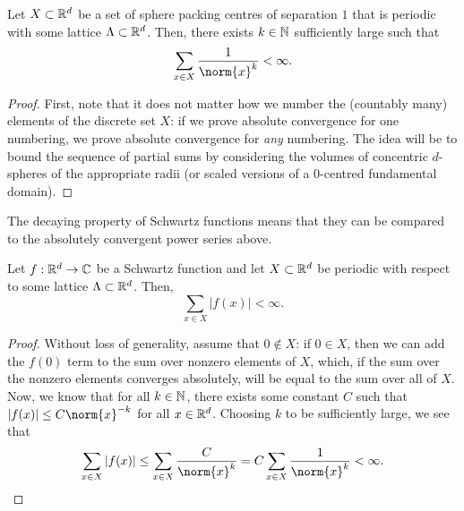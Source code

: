 \begin{lemma}\label{lemma:inv-power-summable}
  Let $X \subset \mathbb{R}^d$ be a set of sphere packing centres of separation $1$ that is periodic with some lattice $\Lambda \subset \mathbb{R}^d$. Then, there exists $k \in \mathbb{N}$ sufficiently large such that
  \[
    \sum_{x \in X} \frac{1}{\norm{x}^{k}} < \infty.
  \]
\end{lemma}
\begin{proof}
  First, note that it does not matter how we number the (countably many) elements of the discrete set $X$: if we prove absolute convergence for one numbering, we prove absolute convergence for \emph{any} numbering. The idea will be to bound the sequence of partial sums by considering the volumes of concentric $d$-spheres of the appropriate radii (or scaled versions of a $0$-centred fundamental domain).



\end{proof}

The decaying property of Schwartz functions means that they can be compared to the absolutely convergent power series above.

\begin{lemma}\label{lemma:Schwartz-summable}
  Let $f : \mathbb{R}^d \to \mathbb{C}$ be a Schwartz function and let $X \subset \mathbb{R}^d$ be periodic with respect to some lattice $\Lambda \subset \mathbb{R}^d$. Then,
  \[
    \sum_{x \in X} |f(x)| < \infty.
  \]
\end{lemma}
\begin{proof}
  Without loss of generality, assume that $0 \notin X$: if $0 \in X$, then we can add the $f(0)$ term to the sum over nonzero elements of $X$, which, if the sum over the nonzero elements converges absolutely, will be equal to the sum over all of $X$. Now, we know that for all $k \in \mathbb{N}$, there exists some constant $C$ such that $|f(x)| \leq C\norm{x}^{-k}$ for all $x \in \mathbb{R}^d$. Choosing $k$ to be sufficiently large, we see that
  \[
    \sum_{x \in X} |f(x)| \leq \sum_{x \in X} \frac{C}{\norm{x}^{k}} = C \sum_{x \in X} \frac{1}{\norm{x}^k} < \infty.
  \]
\end{proof}

